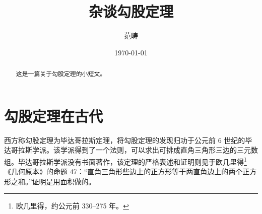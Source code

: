 \documentclass[UTF8]{ctexart}
\title{杂谈勾股定理}
\author{范畴}
\date{\today}
\begin{document}
\maketitle
\begin{abstract}
这是一篇关于勾股定理的小短文。
\end{abstract}

\tableofcontents
\section{勾股定理在古代}

西方称勾股定理为毕达哥拉斯定理，将勾股定理的发现归功于公元前 6 世纪的毕达哥拉斯学派。该学派得到了一个法则，可以求出可排成直角三角形三边的三元数组。毕达哥拉斯学派没有书面著作，该定理的严格表述和证明则见于欧几里得\footnote{欧几里得，约公元前 330--275 年。}《几何原本》的命题 47：“直角三角形些边上的正方形等于两直角边上的两个正方形之和。”证明是用面积做的。
\end{document}
